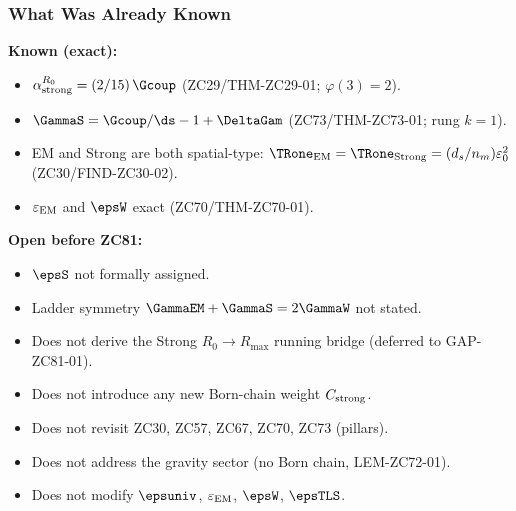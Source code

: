 \documentclass[12pt, a4paper]{article}
\renewcommand{\epsEM}{\varepsilon_{\rm EM}}
\begin{document}
\subsubsection{What Was Already Known}

\begin{keybox}[title={Pre-ZC81 Status of the Strong Sector Floor}]
\textbf{Known (exact):}
\begin{itemize}[leftmargin=2em, noitemsep]
  \item $\alpha_{\rm strong}^{R_0} = (2/15)\,\Gcoup$
    (ZC29/THM-ZC29-01; $\varphi(3)=2$).
  \item $\GammaS = \Gcoup/\ds - 1 + \DeltaGam$
    (ZC73/THM-ZC73-01; rung $k=1$).
  \item EM and Strong are both spatial-type:
    $\TRone_{\rm EM} = \TRone_{\rm Strong} = (d_s/n_m)\varepsilon_0^2$
    (ZC30/FIND-ZC30-02).
  \item $\epsEM$ and $\epsW$ exact (ZC70/THM-ZC70-01).
\end{itemize}

\textbf{Open before ZC81:}
\begin{itemize}[leftmargin=2em, noitemsep]
  \item $\epsS$ not formally assigned.
  \item Ladder symmetry $\GammaEM + \GammaS = 2\GammaW$ not stated.
\end{itemize}
\end{keybox}

\begin{keybox}[title={What ZC81 Does NOT Do}]
\begin{itemize}[leftmargin=2em, noitemsep]
  \item Does not derive the Strong $R_0\to R_{\max}$ running bridge
    (deferred to GAP-ZC81-01).
  \item Does not introduce any new Born-chain weight $C_{\rm strong}$.
  \item Does not revisit ZC30, ZC57, ZC67, ZC70, ZC73 (pillars).
  \item Does not address the gravity sector (no Born chain,
    LEM-ZC72-01).
  \item Does not modify $\epsuniv$, $\epsEM$, $\epsW$, $\epsTLS$.
\end{itemize}
\end{keybox}
\end{document}
